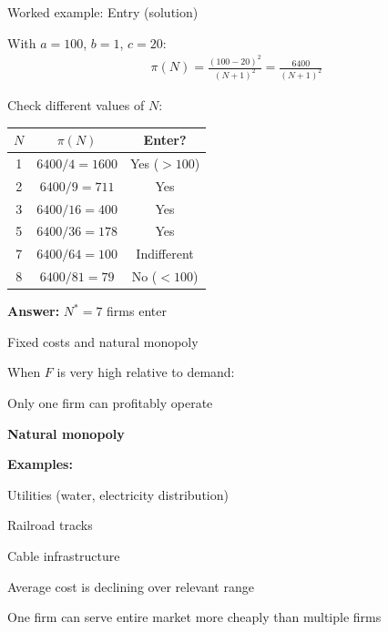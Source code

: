 \documentclass[notes,11pt, aspectratio=169]{beamer}
\newenvironment{wideitemize}{\itemize\addtolength{\itemsep}{10pt}}{\enditemize}
\begin{document}
\begin{frame}{Worked example: Entry (solution)}
	\begin{wideitemize}
		\item With $a = 100$, $b = 1$, $c = 20$:
		\begin{align*}
			\pi(N) = \frac{(100 - 20)^2}{(N + 1)^2} = \frac{6400}{(N + 1)^2}
		\end{align*}
		\item Check different values of $N$:
		\begin{center}
			\begin{tabular}{|c|c|c|}
				\hline
				$N$ & $\pi(N)$ & Enter? \\
				\hline
				1 & $6400/4 = 1600$ & Yes ($> 100$) \\
				2 & $6400/9 = 711$ & Yes \\
				3 & $6400/16 = 400$ & Yes \\
				5 & $6400/36 = 178$ & Yes \\
				7 & $6400/64 = 100$ & Indifferent \\
				8 & $6400/81 = 79$ & No ($< 100$) \\
				\hline
			\end{tabular}
		\end{center}
		\item \textbf{Answer:} $N^* = 7$ firms enter
	\end{wideitemize}
\end{frame}

\begin{frame}{Fixed costs and natural monopoly}
	\begin{wideitemize}
		\item When $F$ is very high relative to demand:
		\begin{wideitemize}
			\vspace{5pt}
			\item Only one firm can profitably operate
			\item \textbf{Natural monopoly}
		\end{wideitemize}
		\item \textbf{Examples:}
		\begin{wideitemize}
			\vspace{5pt}
			\item Utilities (water, electricity distribution)
			\item Railroad tracks
			\item Cable infrastructure
		\end{wideitemize}
		\item Average cost is declining over relevant range
		\item One firm can serve entire market more cheaply than multiple firms
	\end{wideitemize}
\end{frame}
\end{document}
